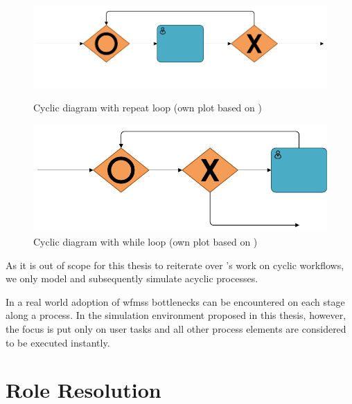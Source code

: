 \begin{figure}[!ht]
	\centering
	\begin{minipage}[b]{0.45\textwidth}
		\includegraphics[width=\textwidth]{img/repeat_loops}
		\caption{Cyclic diagram with repeat loop (own plot based on \citet{Soerensen2005})}
		\label{fig:repeat_loops}
	\end{minipage}
	\hfill
	\begin{minipage}[b]{0.45\textwidth}
		\includegraphics[width=\textwidth]{img/while_loops}
		\caption{Cyclic diagram with while loop (own plot based on \citet{Soerensen2005})}
		\label{fig:while_loops}
	\end{minipage}
\end{figure}

As it is out of scope for this thesis to reiterate over \citet{Soerensen2005}'s work on cyclic workflows, we only model and subsequently simulate acyclic processes.

In a real world adoption of \glspl{wfms} bottlenecks can be encountered on each stage along a process. In the simulation environment proposed in this thesis, however, the focus is put only on user tasks and all other process elements are considered to be executed instantly.

\section{Role Resolution}
\label{sec:role_resolution_theory}

